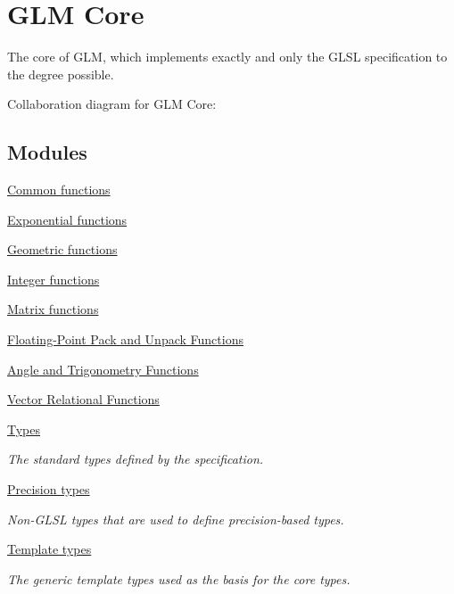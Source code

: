 \hypertarget{group__core}{\section{G\-L\-M Core}
\label{group__core}
}


The core of G\-L\-M, which implements exactly and only the G\-L\-S\-L specification to the degree possible.  


Collaboration diagram for G\-L\-M Core\-:
\subsection*{Modules}
\begin{DoxyCompactItemize}
\item 
\hyperlink{group__core__func__common}{Common functions}
\item 
\hyperlink{group__core__func__exponential}{Exponential functions}
\item 
\hyperlink{group__core__func__geometric}{Geometric functions}
\item 
\hyperlink{group__core__func__integer}{Integer functions}
\item 
\hyperlink{group__core__func__matrix}{Matrix functions}
\item 
\hyperlink{group__core__func__packing}{Floating-\/\-Point Pack and Unpack Functions}
\item 
\hyperlink{group__core__func__trigonometric}{Angle and Trigonometry Functions}
\item 
\hyperlink{group__core__func__vector__relational}{Vector Relational Functions}
\item 
\hyperlink{group__core__types}{Types}
\begin{DoxyCompactList}\small\item\em The standard types defined by the specification. \end{DoxyCompactList}\item 
\hyperlink{group__core__precision}{Precision types}
\begin{DoxyCompactList}\small\item\em Non-\/\-G\-L\-S\-L types that are used to define precision-\/based types. \end{DoxyCompactList}\item 
\hyperlink{group__core__template}{Template types}
\begin{DoxyCompactList}\small\item\em The generic template types used as the basis for the core types. \end{DoxyCompactList}\end{DoxyCompactItemize}



